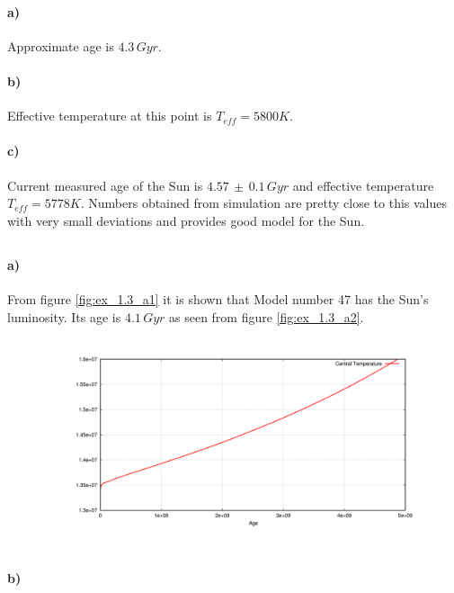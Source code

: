 \documentclass[12pt]{article}
\begin{document}
\paragraph{a)}
Approximate age is $4.3 \, Gyr$.
\paragraph{b)}
Effective temperature at this point is $T_{eff}=5800K$.
\paragraph{c)}
Current measured age of the Sun is $4.57 \,\pm \,0.1 \,Gyr$ and effective temperature $T_{eff}=5778K$. Numbers obtained from simulation are pretty close to this values with very small deviations and provides good model for the Sun.

\subsection{}


\paragraph{a)}
From figure \ref{fig:ex_1.3_a1} it is shown that Model number 47 has the Sun's luminosity. Its age is $4.1 \, Gyr$ as seen from figure \ref{fig:ex_1.3_a2}.

\begin{figure}[ht]
\begin{center}
\includegraphics[width=1.0\textwidth]{ex_1_3_b.png}
\end{center}
\vspace*{-10mm}
\caption{}
\label{fig:ex_1.3_b}
\end{figure}

\paragraph{b)} 
\end{document}
